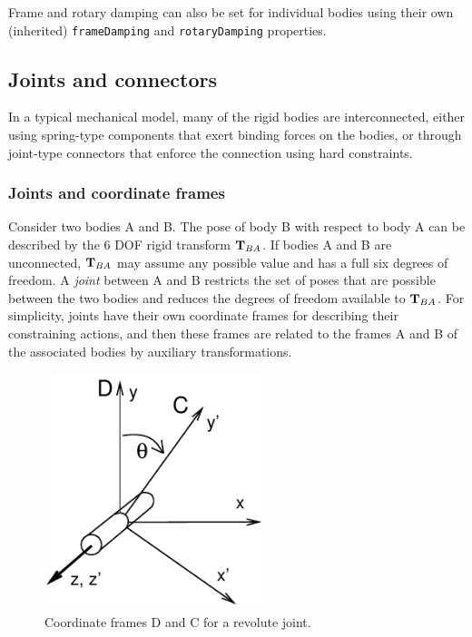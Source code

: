 Frame and rotary damping can also be set for individual bodies using
their own (inherited) {\tt frameDamping} and {\tt rotaryDamping}
properties.

\subsection{Joints and connectors}

In a typical mechanical model, many of the rigid bodies are
interconnected, either using spring-type components that exert binding
forces on the bodies, or through joint-type connectors that enforce
the connection using hard constraints.

\subsubsection{Joints and coordinate frames}

Consider two bodies A and B. The pose of body B with respect to body A
can be described by the 6 DOF rigid transform ${\bf T}_{BA}$.  If bodies A
and B are unconnected, ${\bf T}_{BA}$ may assume any possible value
and has a full six degrees of freedom. A {\it joint} between A and B
restricts the set of poses that are possible between the two bodies
and reduces the degrees of freedom available to ${\bf T}_{BA}$.  For
simplicity, joints have their own coordinate frames for describing
their constraining actions, and then these frames are related to the
frames A and B of the associated bodies by auxiliary transformations.

\begin{figure}[ht]
\begin{center}
 \includegraphics[width=2.5in]{images/jointExample}
\end{center}
\caption{Coordinate frames D and C for a revolute joint.}
\label{jointExample:fig}
\end{figure}

